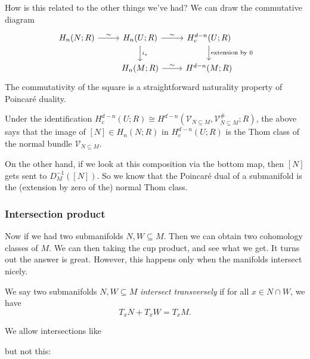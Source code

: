 \documentclass[a4paper]{article}
\theoremstyle{definition}
\begin{document}
How is this related to the other things we've had? We can draw the commutative diagram
\[
  \begin{tikzcd}
    H_n(N; R) \ar[r, "\sim"] & H_n(U; R) \ar[r, "\sim"] \ar[d, "i_*"] & H_c^{d - n}(U; R) \ar[d, "\text{extension by }0"] \\
    & H_n(M; R) \ar[r, "\sim"] & H^{d - n}(M; R)
  \end{tikzcd}
\]
The commutativity of the square is a straightforward naturality property of Poincar\'e duality.

Under the identification $H_c^{d - n}(U; R) \cong H^{d - n}(\mathcal{V}_{N \subseteq M}, \mathcal{V}_{N \subseteq M}^\#; R)$, the above says that the image of $[N] \in H_n(N; R)$ in $H^{d - n}_c(U; R)$ is the Thom class of the normal bundle $\mathcal{V}_{N \subseteq M}$.

On the other hand, if we look at this composition via the bottom map, then $[N]$ gets sent to $D_M^{-1}([N])$. So we know that the Poincar\'e dual of a submanifold is the (extension by zero of the) normal Thom class.

\subsubsection*{Intersection product}
Now if we had two submanifolds $N, W \subseteq M$. Then we can obtain two cohomology classes of $M$. We can then taking the cup product, and see what we get. It turns out the answer is great. However, this happens only when the manifolds intersect nicely.
\begin{defi}
  We say two submanifolds $N, W \subseteq M$ \emph{intersect transversely} if for all $x \in N \cap W$, we have
  \[
    T_x N + T_x W = T_x M.
  \]
\end{defi}

\begin{eg}
  We allow intersections like
  \begin{center}
  \end{center}
  but not this:
  \begin{center}
  \end{center}
\end{eg}
\end{document}
